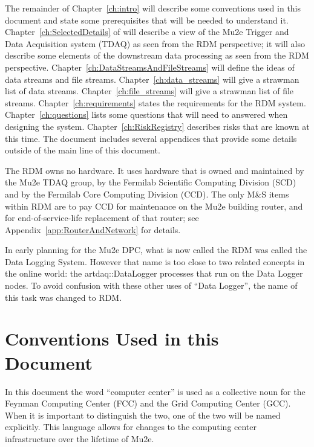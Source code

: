 The remainder of Chapter~\ref{ch:intro} will describe some conventions used in this document and
state some prerequisites that will be needed to understand it.
Chapter~\ref{ch:SelectedDetails}  of will describe a view of the
Mu2e Trigger and Data Acquisition system (TDAQ) as seen from the RDM perspective;
it will also describe some elements of the downstream data processing as seen
from the RDM perspective.
Chapter~\ref{ch:DataStreamsAndFileStreams} will define the ideas of data streams and file streams.
Chapter~\ref{ch:data_streams} will give a strawman list of data streams.
Chapter~\ref{ch:file_streams} will give a strawman list of file streams.
Chapter~\ref{ch:requirements} states the requirements for the RDM system.
Chapter~\ref{ch:questions} lists some questions that will need to answered when designing the system.
Chapter~\ref{ch:RiskRegistry} describes risks that are known at this time.
The document includes several appendices that provide some details outside of the main line
of this document.



The RDM owns no hardware.  It uses hardware that is owned and maintained
by the Mu2e TDAQ group,
by the Fermilab Scientific Computing Division (SCD)
and by the Fermilab Core Computing Division (CCD).
The only M\&S items within RDM are to pay CCD for maintenance on the Mu2e building router,
and for end-of-service-life replacement of that router;
see Appendix~\ref{app:RouterAndNetwork} for details.

In early planning for the Mu2e DPC, what is now called the RDM was called the Data Logging System.
However that name is too close to two related concepts in the online world:
the {\code artdaq::DataLogger} processes that run on the Data Logger nodes.
To avoid confusion with these other uses of ``Data Logger'',
the name of this task was changed to RDM.

\section{Conventions Used in this Document}
\label{sec:conventions}

In this document the word ``computer center'' is used as a collective noun for the
Feynman Computing Center (FCC) and the Grid Computing Center (GCC).
When it is important to distinguish the two, one of the two will be named explicitly.
This language allows for changes to the computing center infrastructure over the
lifetime of Mu2e.

